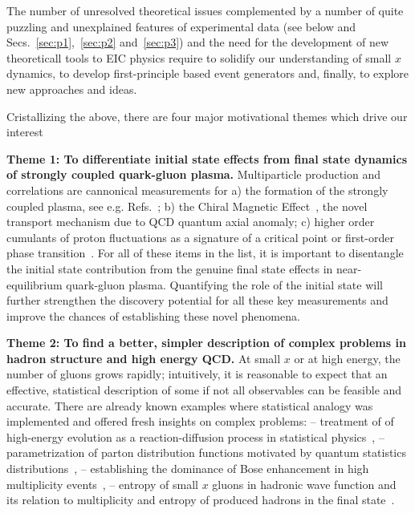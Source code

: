 
The number of unresolved theoretical issues complemented by a number of 
quite puzzling and unexplained features of experimental data (see below and  Secs.~\ref{sec:p1},~\ref{sec:p2} and~\ref{sec:p3})  
and the need for the development of new theoreticall tools to EIC physics 
require to solidify our understanding of small $x$ dynamics, 
to develop first-principle based event generators and, finally, to  
explore new approaches and ideas. 



Cristallizing %
the above, there are four  major motivational themes which  drive our interest  

\vspace{0.5em}

\noindent
{\bf Theme 1: 
To differentiate initial state effects from  final state dynamics of strongly coupled quark-gluon plasma. 
}
Multiparticle production and correlations are cannonical measurements for a) the formation of the strongly coupled 
plasma, see e.g. Refs.~\cite{Schafer:2009dj,Song:2010mg}; b) the Chiral Magnetic Effect~\cite{Kharzeev:2007jp}, the novel transport mechanism due to QCD quantum axial anomaly;
c) higher order cumulants of proton fluctuations as a signature of a critical point or first-order phase transition~\cite{Stephanov:2008qz}. 
For all of these items in the list, it is important to disentangle the initial state contribution from 
the genuine final state effects in near-equilibrium quark-gluon plasma. Quantifying the role of the initial state 
will further strengthen the discovery potential for all these key measurements and improve the chances of 
establishing these novel phenomena.   

\vspace{0.5em}

\noindent
{\bf Theme 2: 
	To find  a better, simpler description of complex problems in hadron structure and 
high energy QCD. 
}	 
At small $x$ or at high energy, the number of gluons grows rapidly; intuitively, it is  
reasonable to expect that an effective, statistical description of some if not all 
observables can be feasible and accurate. There are already known examples where 
statistical analogy  was implemented and offered fresh insights on complex problems: 
-- treatment of of high-energy evolution as a reaction-diffusion process in statistical physics~\cite{Munier:2003vc,Iancu:2004es,Kutak:2011rb}, 
-- parametrization of parton distribution functions motivated by quantum statistics distributions~\cite{Mac:1989ki,Bhalerao:1996fc,Bourrely:2001du}, 
-- establishing the dominance of Bose enhancement in high multiplicity events~\cite{Kovner:2018azs}, 
-- entropy of small $x$ gluons in hadronic wave function and its relation to 
multiplicity and entropy of produced hadrons in the final state~\cite{Peschanski:2012cw,Kovner:2015hga,Kharzeev:2017qzs,Shuryak:2017phz,Hagiwara:2017uaz}.  



